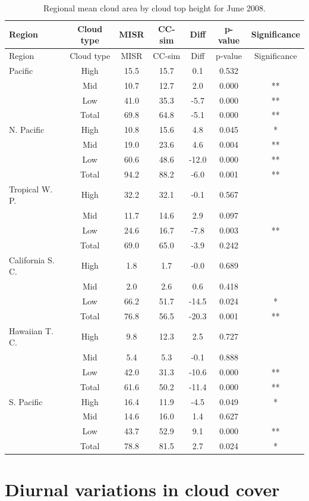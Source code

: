 \begin{longtable}[]{@{}lcccccc@{}}
\caption{\label{tbl:misr_cldmisr_table_june}Regional mean cloud area by
cloud top height for June 2008. }\tabularnewline
\toprule
Region & Cloud type & MISR & CC-sim & Diff & p-value &
Significance\tabularnewline
\midrule
\endfirsthead
\toprule
Region & Cloud type & MISR & CC-sim & Diff & p-value &
Significance\tabularnewline
\midrule
\endhead
Pacific & High & 15.5 & 15.7 & 0.1 & 0.532 &\tabularnewline
& Mid & 10.7 & 12.7 & 2.0 & 0.000 & **\tabularnewline
& Low & 41.0 & 35.3 & -5.7 & 0.000 & **\tabularnewline
& Total & 69.8 & 64.8 & -5.1 & 0.000 & **\tabularnewline
N. Pacific & High & 10.8 & 15.6 & 4.8 & 0.045 & *\tabularnewline
& Mid & 19.0 & 23.6 & 4.6 & 0.004 & **\tabularnewline
& Low & 60.6 & 48.6 & -12.0 & 0.000 & **\tabularnewline
& Total & 94.2 & 88.2 & -6.0 & 0.001 & **\tabularnewline
Tropical W. P. & High & 32.2 & 32.1 & -0.1 & 0.567 &\tabularnewline
& Mid & 11.7 & 14.6 & 2.9 & 0.097 &\tabularnewline
& Low & 24.6 & 16.7 & -7.8 & 0.003 & **\tabularnewline
& Total & 69.0 & 65.0 & -3.9 & 0.242 &\tabularnewline
California S. C. & High & 1.8 & 1.7 & -0.0 & 0.689 &\tabularnewline
& Mid & 2.0 & 2.6 & 0.6 & 0.418 &\tabularnewline
& Low & 66.2 & 51.7 & -14.5 & 0.024 & *\tabularnewline
& Total & 76.8 & 56.5 & -20.3 & 0.001 & **\tabularnewline
Hawaiian T. C. & High & 9.8 & 12.3 & 2.5 & 0.727 &\tabularnewline
& Mid & 5.4 & 5.3 & -0.1 & 0.888 &\tabularnewline
& Low & 42.0 & 31.3 & -10.6 & 0.000 & **\tabularnewline
& Total & 61.6 & 50.2 & -11.4 & 0.000 & **\tabularnewline
S. Pacific & High & 16.4 & 11.9 & -4.5 & 0.049 & *\tabularnewline
& Mid & 14.6 & 16.0 & 1.4 & 0.627 &\tabularnewline
& Low & 43.7 & 52.9 & 9.1 & 0.000 & **\tabularnewline
& Total & 78.8 & 81.5 & 2.7 & 0.024 & *\tabularnewline
\bottomrule
\end{longtable}

\section{Diurnal variations in cloud cover}\label{sec:misrux5fdiurnal}

